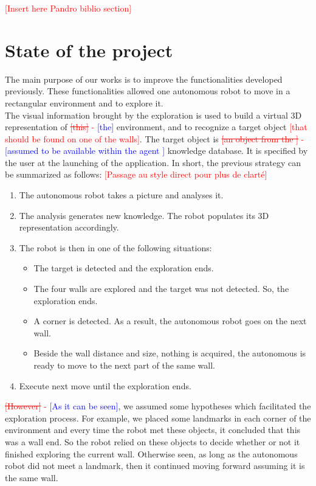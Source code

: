 \documentclass[12pt]{report}
\newcommand{\hcr}[2]{\textcolor{red}{\sout{[#1]} - \textcolor{blue}{ [#2]}}}
\newcommand{\hc}[1]{\textcolor{red}{[#1]}}
\begin{document}
\hc{Insert here Pandro biblio section}


\section{State of the project}

	The main purpose of our works is to improve the functionalities developed previously. These functionalities 
allowed one autonomous robot to move in a rectangular environment and to explore it.\\
	The visual information brought by the exploration is used to build a virtual 3D representation of 
\hcr{this}{the} environment, and to recognize a target object \hc{that should be found on one of the walls}. The target 
object is \hcr{an object from the }{assumed to be available within the agent } knowledge database. It is specified by 
the user at the launching of the application.
In short, the previous strategy can be summarized as follows:
\hc{Passage au style direct pour plus de clarté}
	\begin{enumerate}
		\item The autonomous robot takes a picture and analyses it.
		\item The analysis generates new knowledge. The robot populates its 3D representation accordingly. 
		\item The robot is then in one of the following situations:
		\begin{itemize}
			\item The target is detected and the exploration ends.
			\item The four walls are explored and the target was not detected. So, the exploration ends.
			\item A corner is detected. As a result, the autonomous robot goes on the next wall.
			\item Beside the wall distance and size, nothing is acquired, the autonomous is ready to move 
to the next part of the same wall.
		\end{itemize}
		\item Execute next move until the exploration ends.
	\end{enumerate}

	
	\hcr{However}{As it can be seen}, we assumed some hypotheses which facilitated the exploration process. For 
example, we placed some landmarks in each corner of the environment and every time the robot met 
these objects, it concluded that this was a wall end. So the robot relied on these objects to decide whether 
or not it finished exploring the current wall. Otherwise seen, as long as the autonomous robot did not meet a landmark, 
then it continued moving forward assuming it is the same wall.\\
	
\end{document}
